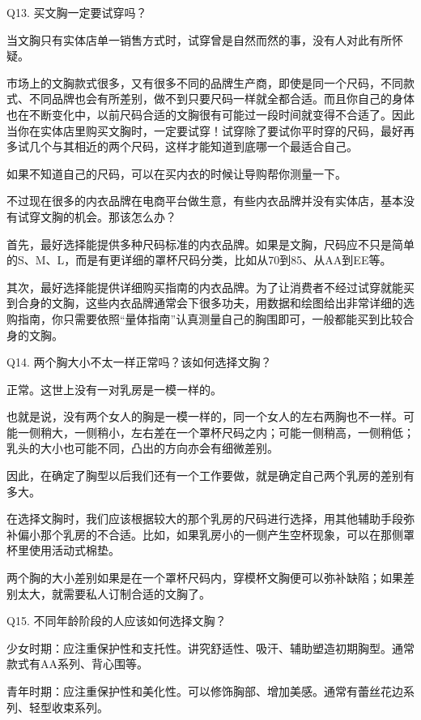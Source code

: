 \documentclass[12pt,UTF8]{ctexbook}
\begin{document}
Q13. 买文胸一定要试穿吗？


当文胸只有实体店单一销售方式时，试穿曾是自然而然的事，没有人对此有所怀疑。

市场上的文胸款式很多，又有很多不同的品牌生产商，即使是同一个尺码，不同款式、不同品牌也会有所差别，做不到只要尺码一样就全都合适。而且你自己的身体也在不断变化中，以前尺码合适的文胸很有可能过一段时间就变得不合适了。因此当你在实体店里购买文胸时，一定要试穿！试穿除了要试你平时穿的尺码，最好再多试几个与其相近的两个尺码，这样才能知道到底哪一个最适合自己。

如果不知道自己的尺码，可以在买内衣的时候让导购帮你测量一下。

不过现在很多的内衣品牌在电商平台做生意，有些内衣品牌并没有实体店，基本没有试穿文胸的机会。那该怎么办？

首先，最好选择能提供多种尺码标准的内衣品牌。如果是文胸，尺码应不只是简单的S、M、L，而是有更详细的罩杯尺码分类，比如从70到85、从AA到EE等。

其次，最好选择能提供详细购买指南的内衣品牌。为了让消费者不经过试穿就能买到合身的文胸，这些内衣品牌通常会下很多功夫，用数据和绘图给出非常详细的选购指南，你只需要依照“量体指南”认真测量自己的胸围即可，一般都能买到比较合身的文胸。





Q14. 两个胸大小不太一样正常吗？该如何选择文胸？


正常。这世上没有一对乳房是一模一样的。

也就是说，没有两个女人的胸是一模一样的，同一个女人的左右两胸也不一样。可能一侧稍大，一侧稍小，左右差在一个罩杯尺码之内；可能一侧稍高，一侧稍低；乳头的大小也可能不同，凸出的方向亦会有细微差别。

因此，在确定了胸型以后我们还有一个工作要做，就是确定自己两个乳房的差别有多大。

在选择文胸时，我们应该根据较大的那个乳房的尺码进行选择，用其他辅助手段弥补偏小那个乳房的不合适。比如，如果乳房小的一侧产生空杯现象，可以在那侧罩杯里使用活动式棉垫。

两个胸的大小差别如果是在一个罩杯尺码内，穿模杯文胸便可以弥补缺陷；如果差别太大，就需要私人订制合适的文胸了。





Q15. 不同年龄阶段的人应该如何选择文胸？


少女时期：应注重保护性和支托性。讲究舒适性、吸汗、辅助塑造初期胸型。通常款式有AA系列、背心围等。

青年时期：应注重保护性和美化性。可以修饰胸部、增加美感。通常有蕾丝花边系列、轻型收束系列。
\end{document}
